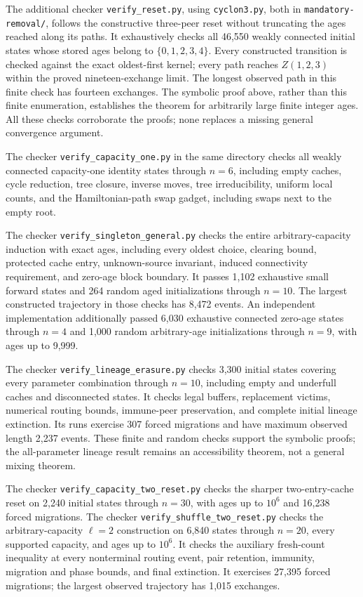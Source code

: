 \documentclass[11pt]{article}
\begin{document}
The additional checker \texttt{verify\_reset.py}, using
\texttt{cyclon3.py}, both in \texttt{mandatory-removal/},
follows the constructive
three-peer reset without truncating the ages reached along its
paths. It exhaustively checks all 46,550 weakly connected initial
states whose stored ages belong to $\{0,1,2,3,4\}$.
Every constructed transition is checked against the exact
oldest-first kernel; every path reaches $Z(1,2,3)$ within the
proved nineteen-exchange limit. The longest observed path in this
finite check has fourteen exchanges. The symbolic proof above,
rather than this finite enumeration, establishes the theorem for
arbitrarily large finite integer ages. All these checks corroborate
the proofs; none replaces a missing general convergence argument.

The checker \texttt{verify\_capacity\_one.py} in the same directory
checks all weakly connected capacity-one identity states through
$n=6$, including empty caches, cycle reduction, tree closure,
inverse moves, tree irreducibility, uniform local counts, and
the Hamiltonian-path swap gadget, including swaps next to the
empty root.

The checker \texttt{verify\_singleton\_general.py} checks the
entire arbitrary-capacity induction with exact ages, including
every oldest choice, clearing bound, protected cache entry,
unknown-source invariant, induced connectivity requirement, and
zero-age block boundary. It passes 1,102 exhaustive small
forward states and 264 random aged initializations through
$n=10$. The largest constructed trajectory in those checks has
8,472 events. An independent implementation additionally passed
6,030 exhaustive connected zero-age states through $n=4$ and
1,000 random arbitrary-age initializations through $n=9$,
with ages up to 9,999.

The checker \texttt{verify\_lineage\_erasure.py} checks 3,300
initial states covering every parameter combination through
$n=10$, including empty and underfull caches and disconnected
states. It checks legal buffers, replacement victims, numerical
routing bounds, immune-peer preservation, and complete initial
lineage extinction. Its runs exercise 307 forced migrations
and have maximum observed length 2,237 events.
These finite and random checks support the symbolic proofs;
the all-parameter lineage result remains an accessibility
theorem, not a general mixing theorem.

The checker \texttt{verify\_capacity\_two\_reset.py} checks the
sharper two-entry-cache reset on 2,240 initial states through
$n=30$, with ages up to $10^6$ and 16,238 forced migrations.
The checker \texttt{verify\_shuffle\_two\_reset.py} checks the
arbitrary-capacity $\ell=2$ construction on 6,840 states
through $n=20$, every supported capacity, and ages up to $10^6$.
It checks the auxiliary fresh-count inequality at every
nonterminal routing event, pair retention, immunity, migration
and phase bounds, and final extinction. It exercises 27,395
forced migrations; the largest observed trajectory has
1,015 exchanges.
\end{document}
